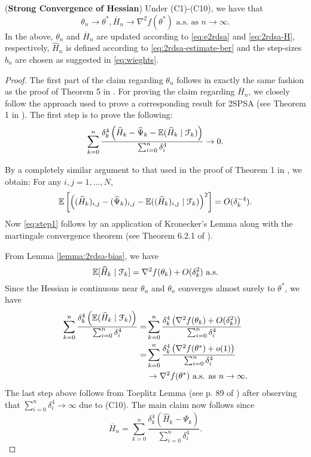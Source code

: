 \begin{theorem}(\textbf{Strong Convergence of Hessian})
\label{thm:2rdsa-H}
Under (C1)-(C10), we have that 
$$\theta_n \rightarrow \theta^*, \overline H_n \rightarrow \nabla^2 f(\theta^*) \text{ a.s. as } n\rightarrow \infty.$$ 
In the above, $\theta_n$ and $\overline H_n$ are updated according to \eqref{eq:e2rdsa} and \eqref{eq:2rdsa-H}, respectively, $\widehat H_n$ is defined according to \eqref{eq:2rdsa-estimate-ber} and the step-sizes $b_n$ are chosen as suggested in \eqref{eq:wieghts}. 
\end{theorem}
\begin{proof}
The first part of the claim regarding $\theta_n$ follows in exactly the same fashion as the proof of Theorem 5 in \cite{prashanth2015rdsa}.  
For proving the claim regarding $\overline H_n$, we closely follow the approach used to prove a corresponding result for 2SPSA (see Theorem 1 in \cite{spall-jacobian}). 
The first step is to prove the following:
\begin{align}
\sum_{k=0}^n \dfrac{\delta_k^4 \left(\widehat H_k - \widehat \Psi_k - \mathbb{E}(\widehat H_k \mid \mathcal{F}_k)\right)}{\sum_{i=0}^n \delta_i^4} \rightarrow 0.
\label{eq:step1}
\end{align}

By a completely similar argument to that used in the proof of Theorem 1 in \cite{spall-jacobian}, we obtain: For any $i,j = 1,\ldots,N$,
\begin{align*}
\mathbb{E} \left[\left((\widehat {H}_k)_{i,j} - (\widehat {\Psi}_k)_{i,j} - \mathbb{E}((\widehat {H}_k)_{i,j} \mid \mathcal{F}_k)\right)^2\right] = O(\delta_k^{-4}).
\end{align*}
Now \eqref{eq:step1} follows by an application of Kronecker's Lemma along with the martingale convergence theorem (see Theorem 6.2.1 of \cite{lahaprobability}).

From Lemma \ref{lemma:2rdsa-bias}, we have 
$$ \mathbb{E}[ \widehat H_k \mid \mathcal{F}_k] = \nabla^2 f(\theta_k) + O(\delta_k^2) \text{ a.s.}$$
Since the Hessian is continuous near $\theta_n$ and $\theta_n$ converges almost surely to $\theta^*$, we have
\begin{align*}
\sum_{k=0}^n \dfrac{\delta_k^4 \left(\mathbb{E}(\widehat H_k \mid \mathcal{F}_k)\right)}{\sum_{i=0}^n \delta_i^4} 
=&\sum_{k=0}^n \dfrac{\delta_k^4 \left(\nabla^2 f(\theta_k) + O(\delta_k^2)\right)}{\sum_{i=0}^n \delta_i^4}\\
=&\sum_{k=0}^n \dfrac{\delta_k^4 \left(\nabla^2 f(\theta^*) + o(1)\right)}{\sum_{i=0}^n \delta_i^4}\\
&\rightarrow \nabla^2 f(\theta^*) \text{ a.s. as } n \rightarrow \infty.
\end{align*}
The last step above follows from Toeplitz Lemma (see p. 89 of \cite{lahaprobability}) after observing that $\sum_{i=0}^n \delta_i^4 \rightarrow \infty$ due to (C10). 
The main claim now follows since 
$$ \overline H_n = \sum_{k=0}^n \dfrac{\delta_k^4 \left(\widehat H_k - \Psi_k \right)}{\sum_{i=0}^n \delta_i^4}.$$
\end{proof}


